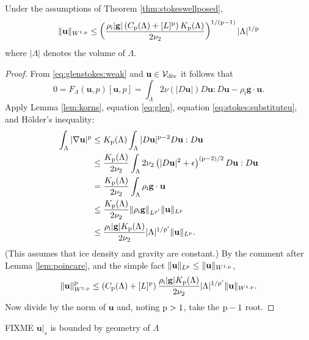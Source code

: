 \documentclass[hidelinks,onefignum,onetabnum,final]{siamart220329}  %
\newcommand{\eps}{\epsilon}
\newcommand{\grad}{\nabla}
\newcommand{\bg}{\mathbf{g}}
\newcommand{\bu}{\mathbf{u}}
\newcommand{\cV}{\mathcal{V}}
\newcommand{\pp}{{\text{\textnormal{p}}}}
\newcommand{\rhoi}{\rho_{\text{i}}}
\newcommand{\Vdiv}{\cV_{\text{\textnormal{div}}}}
\begin{document}
\begin{lemma} \label{lem:stokesapriori}
Under the assumptions of Theorem \ref{thm:stokeswellposed},
\begin{equation}
\|\bu\|_{W^{1,\pp}} \le \left(\frac{\rhoi |\bg| \left(C_{\pp}(\Lambda) + [L]^\pp\right) K_{\pp}(\Lambda)}{2 \nu_2}\right)^{1/(\pp-1)} |\Lambda|^{1/\pp}
\end{equation}
where $|\Lambda|$ denotes the volume of $\Lambda$.
\end{lemma}

\begin{proof}
From \eqref{eq:glenstokes:weak} and $\bu \in\Vdiv$ it follows that
\begin{equation}
0= F_\Lambda(\bu,p)[\bu,p] = \int_\Lambda 2 \nu(|D\bu|) D\bu : D\bu - \rhoi \bg \cdot \bu.  \label{eq:stokes:substituteu}
\end{equation}
Apply Lemma \ref{lem:korns}, equation \eqref{eq:glen}, equation \eqref{eq:stokes:substituteu}, and H\"older's inequality:
\begin{align}
\int_\Lambda |\grad\bu|^\pp &\le K_{\pp}(\Lambda) \int_\Lambda |D\bu|^{\pp-2} D\bu:D\bu \label{eq:stokes:workapriori} \\
	&\le \frac{K_{\pp}(\Lambda)}{2 \nu_2} \int_\Lambda 2 \nu_2 \left(|D\bu|^2 + \eps\right)^{(\pp-2)/2} D\bu:D\bu \notag \\
	&= \frac{K_{\pp}(\Lambda)}{2 \nu_2} \int_\Lambda \rhoi \bg \cdot \bu \notag \\
	&\le \frac{K_{\pp}(\Lambda)}{2 \nu_2} \|\rhoi \bg\|_{L^{\pp'}} \|\bu\|_{L^\pp} \notag \\
	&\le \frac{\rhoi |\bg| K_{\pp}(\Lambda)}{2 \nu_2} |\Lambda|^{1/\pp'} \|\bu\|_{L^\pp}. \notag
\end{align}
(This assumes that ice density and gravity are constant.)  By the comment after Lemma \ref{lem:poincare}, and the simple fact $\|\bu\|_{L^\pp} \le \|\bu\|_{W^{1,\pp}}$,
\begin{align*}
\|\bu\|_{W^{1,\pp}}^\pp \le \left(C_{\pp}(\Lambda) + [L]^\pp\right) \frac{\rhoi |\bg| K_{\pp}(\Lambda)}{2 \nu_2} |\Lambda|^{1/\pp'} \|\bu\|_{W^{1,\pp}}.
\end{align*}
Now divide by the norm of $\bu$ and, noting $\pp>1$, take the $\pp-1$ root.
\end{proof}

\begin{lemma} \label{lem:stokestrace}
FIXME $\bu|_s$ is bounded by geometry of $\Lambda$
\end{lemma}
\end{document}
